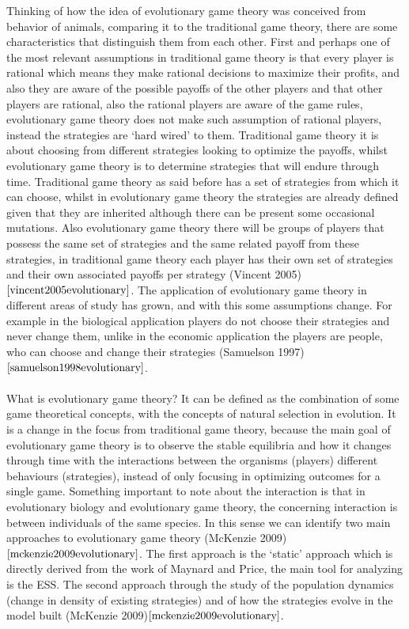 \documentclass{article}
\begin{document}
Thinking of how the idea of evolutionary game theory was conceived from behavior of animals, comparing it to the traditional game theory, there are some characteristics that distinguish them from each other. First and perhaps one of the most relevant assumptions in traditional game theory is that every player is rational which means they make rational decisions to maximize their profits, and also they are aware of the possible payoffs of the other players and that other players are rational, also the rational players are aware of the game rules, evolutionary game theory does not make such assumption of rational players, instead the strategies are ‘hard wired’ to them.  Traditional game theory it is about choosing from different strategies looking to optimize the payoffs, whilst evolutionary game theory is to determine strategies that will endure through time. Traditional game theory as said before has a set of strategies from which it can choose, whilst in evolutionary game theory the strategies are already defined given that they are inherited although there can be present some occasional mutations. Also evolutionary game theory there will be groups of players that possess the same set of strategies and the same related payoff from these strategies, in traditional game theory each player has their own set of strategies and their own associated payoffs per strategy (Vincent 2005)$\cite{vincent2005evolutionary}$.  The application of evolutionary game theory in different areas of study has grown, and with this some assumptions change. For example in the biological application players do not choose their strategies and never change them, unlike in the economic application the players are people, who can choose and change their strategies (Samuelson 1997)$\cite{samuelson1998evolutionary}$.
\\\\What is evolutionary game theory?
It can be defined as the combination of some game theoretical concepts, with the concepts of natural selection in evolution. It is a change in the focus from traditional game theory, because the main goal of evolutionary game theory is to observe the stable equilibria and how it changes through time with the interactions between the organisms (players) different behaviours (strategies), instead of only focusing in optimizing outcomes for a single game. Something important to note about the interaction is that in evolutionary biology and evolutionary game theory, the concerning interaction is between individuals of the same species. In this sense we can identify two main approaches to evolutionary game theory (McKenzie 2009)$\cite{mckenzie2009evolutionary}$. The first approach is the ‘static’ approach which is directly derived from the work of Maynard and Price, the main tool for analyzing is the ESS. The second approach through the study of the population dynamics (change in density of existing strategies) and of how the strategies evolve in the model built (McKenzie 2009)$\cite{mckenzie2009evolutionary}$.
\end{document}
